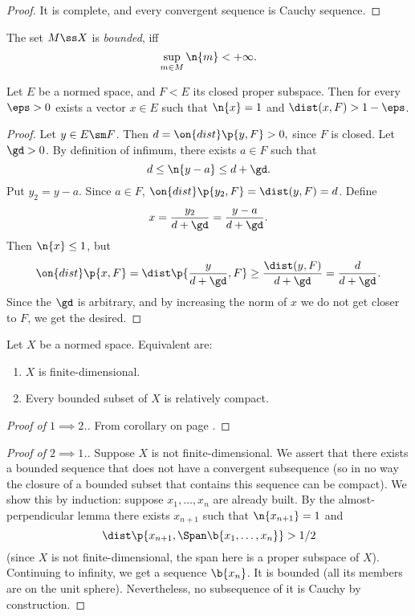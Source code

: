 \begin{proof}
  It is complete, and every convergent sequence is Cauchy sequence.
\end{proof}

\begin{definition}
  The set $M \ss X$ is \emph{bounded}, iff
  $$ \sup_{m \in M} \n{m} < +\infty. $$
\end{definition}

\begin{lemma}
  Let $E$ be a normed space, and $F < E$ its closed proper subspace.
  Then for every $\eps > 0$ exists a vector $x \in E$ such that $\n{x} = 1$ and $\dist(x, F) > 1-\eps$.
\end{lemma}

\begin{proof}
  Let $y \in E \sm F$.
  Then $d = \on{dist}\p{y, F} > 0,$ since $F$ is closed.
  Let $\gd > 0$.
  By definition of infimum, there exists $a \in F$ such that
  $$ d \le \n{y - a} \le d + \gd. $$
  Put $y_2 = y-a$.
  Since $a \in F$, $\on{dist}\p{y_2, F} = \dist(y, F) = d$.
  Define
  $$ x = \frac{y_2}{d+\gd} = \frac{y-a}{d+\gd}. $$
  Then $\n{x} \le 1$, but
  $$ \on{dist}\p{x, F} = \dist\p{\frac{y}{d+\gd}, F} \ge \frac{\dist(y, F)}{d+\gd} = \frac{d}{d+\gd}. $$
  Since the $\gd$ is arbitrary, and by increasing the norm of $x$ we do not get closer to $F$, we get the desired.
\end{proof}

\begin{theorem}
  Let $X$ be a normed space. Equivalent are:
  \begin{enumerate}
    \item $X$ is finite-dimensional.
    \item Every bounded subset of $X$ is relatively compact.
  \end{enumerate}  
\end{theorem}

\begin{proof}[Proof of $1 \implies 2$.]
  From corollary on page \pageref{finite-dimensional implies closed}.
\end{proof}

\begin{proof}[Proof of $2 \implies 1$.]
  Suppose $X$ is not finite-dimensional.
  We assert that there exists a bounded sequence that does not have a convergent subsequence (so in no way the closure of a bounded subset that contains this sequence can be compact).
  We show this by induction: suppose $x_1, \dots, x_n$ are already built.
  By the almost-perpendicular lemma there exists $x_{n+1}$ such that
  $\n{x_{n+1}} = 1$ and
  $$ \dist\p{x_{n+1}, \Span\b{x_1, \dots, x_n}} > {1}/{2} $$
  (since $X$ is not finite-dimensional, the span here is a proper subspace of $X$).
  Continuing to infinity, we get a sequence $\b{x_n}$. It is bounded (all its members are on the unit sphere). Nevertheless, no subsequence of it is Cauchy by construction.
\end{proof}

